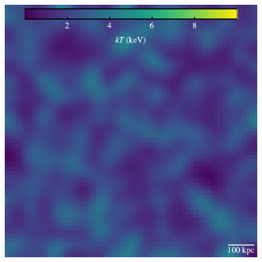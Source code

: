 \documentclass[usenatbib]{mnras}
\begin{document}
\begin{figure}
\includegraphics{../pdf/013.pdf}
\caption[]{\lipsum[66]}
\label{fig013}
\end{figure}

\lipsum[1-3]
\end{document}

